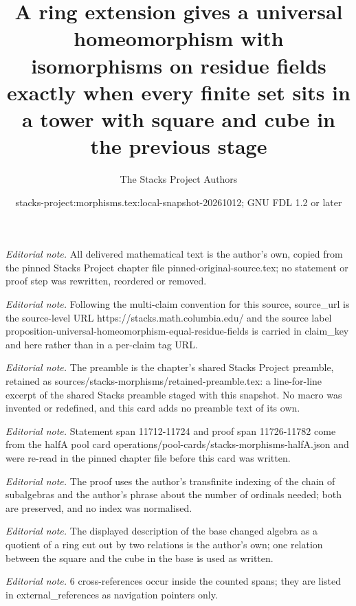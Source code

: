 \documentclass[10pt,a4paper]{amsart}
\title{A ring extension gives a universal homeomorphism with isomorphisms on residue fields exactly when every finite set sits in a tower with square and cube in the previous stage}
\author{The Stacks Project Authors}
\date{stacks-project:morphisms.tex:local-snapshot-20261012; GNU FDL 1.2 or later}
\theoremstyle{plain}
\theoremstyle{definition}
\theoremstyle{remark}
\numberwithin{equation}{subsection}
\begin{document}
\maketitle
\noindent\textit{Editorial note.} All delivered mathematical text is the author's own, copied from the pinned Stacks Project chapter file pinned-original-source.tex; no statement or proof step was rewritten, reordered or removed.\par\medskip
\noindent\textit{Editorial note.} Following the multi-claim convention for this source, source\_url is the source-level URL https://stacks.math.columbia.edu/ and the source label proposition-universal-homeomorphism-equal-residue-fields is carried in claim\_key and here rather than in a per-claim tag URL.\par\medskip
\noindent\textit{Editorial note.} The preamble is the chapter's shared Stacks Project preamble, retained as sources/stacks-morphisms/retained-preamble.tex: a line-for-line excerpt of the shared Stacks preamble staged with this snapshot. No macro was invented or redefined, and this card adds no preamble text of its own.\par\medskip
\noindent\textit{Editorial note.} Statement span 11712-11724 and proof span 11726-11782 come from the halfA pool card operations/pool-cards/stacks-morphisms-halfA.json and were re-read in the pinned chapter file before this card was written.\par\medskip
\noindent\textit{Editorial note.} The proof uses the author's transfinite indexing of the chain of subalgebras and the author's phrase about the number of ordinals needed; both are preserved, and no index was normalised.\par\medskip
\noindent\textit{Editorial note.} The displayed description of the base changed algebra as a quotient of a ring cut out by two relations is the author's own; one relation between the square and the cube in the base is used as written.\par\medskip
\noindent\textit{Editorial note.} 6 cross-references occur inside the counted spans; they are listed in external\_references as navigation pointers only.\par\medskip
\end{document}
